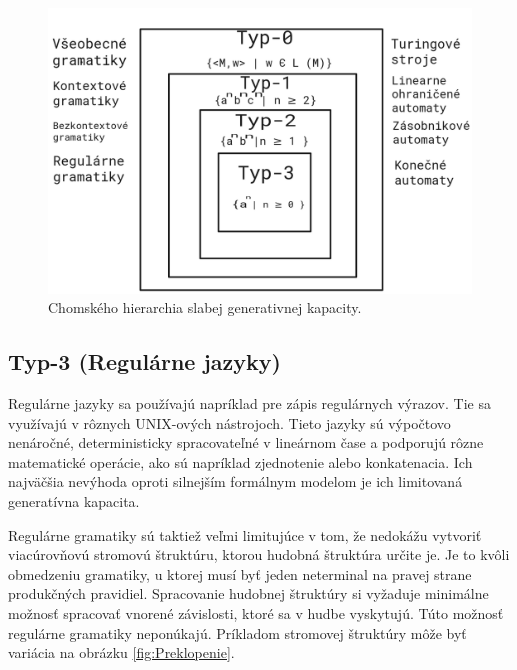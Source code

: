 \begin{figure}[H]
    \centering
    \includegraphics[scale=0.3]{obrazky-figures/ChomHier.png}
    \caption{Chomského hierarchia slabej generativnej kapacity.}
    \label{fig:chomhier}
\end{figure}

\subsection*{Typ-3 (Regulárne jazyky)}
Regulárne jazyky sa používajú napríklad pre zápis regulárnych výrazov. Tie sa využívajú v rôznych UNIX-ových nástrojoch. Tieto jazyky sú výpočtovo nenáročné, deterministicky spracovateľné v lineárnom čase a podporujú rôzne matematické operácie, ako sú napríklad zjednotenie alebo konkatenacia. Ich najväčšia nevýhoda oproti silnejším formálnym modelom je ich limitovaná generatívna kapacita.

Regulárne gramatiky sú taktiež veľmi limitujúce v tom, že nedokážu vytvoriť viacúrovňovú stromovú štruktúru, ktorou hudobná štruktúra určite je. Je to kvôli obmedzeniu gramatiky, u ktorej musí byť jeden neterminal na pravej strane produkčných pravidiel. Spracovanie hudobnej štruktúry si vyžaduje minimálne možnosť spracovať vnorené závislosti, ktoré sa v hudbe vyskytujú. Túto možnosť regulárne gramatiky neponúkajú. Príkladom stromovej štruktúry môže byť variácia na obrázku \ref{fig:Preklopenie}.

